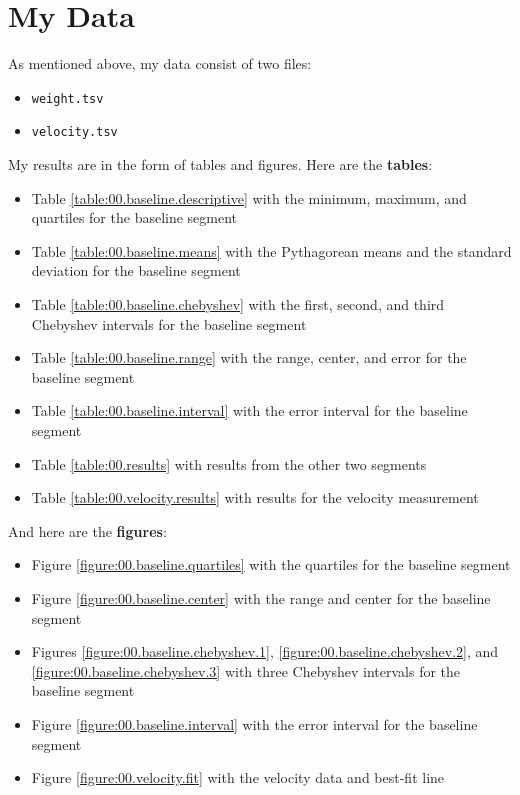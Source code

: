 \section{My Data}
As mentioned above, my data consist of two files:
\begin{itemize}
    \item \texttt{weight.tsv}
    \item \texttt{velocity.tsv}
\end{itemize}
My results are in the form of tables and figures. Here are the \textbf{tables}:
\begin{itemize}
    \item Table \ref{table:00.baseline.descriptive} with the minimum, maximum, and quartiles for the baseline segment
    \item Table \ref{table:00.baseline.means} with the Pythagorean means and the standard deviation for the baseline segment
    \item Table \ref{table:00.baseline.chebyshev} with the first, second, and third Chebyshev intervals for the baseline segment
    \item Table \ref{table:00.baseline.range} with the range, center, and error for the baseline segment
    \item Table \ref{table:00.baseline.interval} with the error interval for the baseline segment
    \item Table \ref{table:00.results} with results from the other two segments
    \item Table \ref{table:00.velocity.results} with results for the velocity measurement
\end{itemize}
And here are the \textbf{figures}:
\begin{itemize}
    \item Figure \ref{figure:00.baseline.quartiles} with the quartiles for the baseline segment
    \item Figure \ref{figure:00.baseline.center} with the range and center for the baseline segment
    \item Figures \ref{figure:00.baseline.chebyshev.1}, \ref{figure:00.baseline.chebyshev.2}, and \ref{figure:00.baseline.chebyshev.3} with three Chebyshev intervals for the baseline segment
    \item Figure \ref{figure:00.baseline.interval} with the error interval for the baseline segment
    \item Figure \ref{figure:00.velocity.fit} with the velocity data and best-fit line
\end{itemize}
